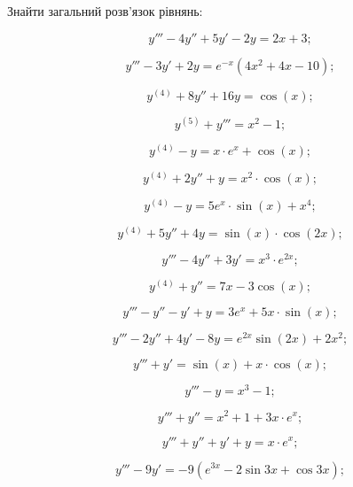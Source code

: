 Знайти загальний розв’язок рівнянь:

\begin{multicols}{2}
\begin{problem}
	\[y'''-4y''+5y'-2y=2x+3;\]
\end{problem}
\begin{problem}
	\[y'''-3y'+2y=e^{-x}(4x^2+4x-10);\]
\end{problem}
\begin{problem}
	\[y^{(4)}+8y''+16y=\cos(x);\]
\end{problem}
\begin{problem}
	\[y^{(5)}+y'''=x^2-1;\]
\end{problem}
\begin{problem}
	\[y^{(4)}-y=x\cdot e^x+\cos(x);\]
\end{problem}
\begin{problem}
	\[y^{(4)}+2y''+y=x^2\cdot\cos(x);\]
\end{problem}
\begin{problem}
	\[y^{(4)}-y=5e^x\cdot\sin(x)+x^4;\]
\end{problem}
\begin{problem}
	\[y^{(4)}+5y''+4y=\sin(x)\cdot\cos(2x);\]
\end{problem}
\begin{problem}
	\[y'''-4y''+3y'=x^3 \cdot e^{2x};\]
\end{problem}
\begin{problem}
	\[y^{(4)}+y''=7x-3\cos(x);\]
\end{problem}
\begin{problem}
	\[y'''-y''-y'+y=3e^x+5x\cdot\sin(x);\]
\end{problem}
\begin{problem}
	\[y'''-2y''+4y'-8y=e^{2x}\sin(2x)+2x^2;\]
\end{problem}
\begin{problem}
	\[y'''+y'=\sin(x)+x\cdot\cos(x);\]
\end{problem}
\begin{problem}
	\[y'''-y=x^3-1;\]
\end{problem}
\begin{problem}
	\[y'''+y''=x^2+1+3x\cdot e^x;\]
\end{problem}
\begin{problem}
	\[y'''+y''+y'+y=x\cdot e^x;\]
\end{problem}
\begin{problem}
	\[y'''-9y'=-9(e^{3x}-2\sin3x+\cos3x);\]
\end{problem}
\begin{problem}

\end{problem}
\end{multicols}
